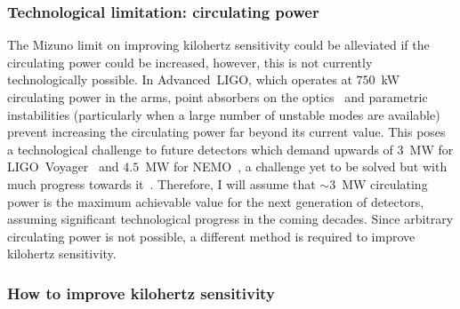 \subsubsection{Technological limitation: circulating power}
\label{sec:circulating_power}

The Mizuno limit on improving kilohertz sensitivity could be alleviated if the circulating power could be increased, however, this is not currently technologically possible. In Advanced~LIGO, which operates at $750$~kW circulating power in the arms, point absorbers on the optics~\cite{Brooks_2021} and parametric instabilities (particularly when a large number of unstable modes are available)~\cite{PhysRevLett.114.161102} prevent increasing the circulating power far beyond its current value. This poses a technological challenge to future detectors which demand upwards of $3$~MW for LIGO~Voyager~\cite{} and $4.5$~MW for NEMO~\cite{}, a challenge yet to be solved but with much progress towards it~\cite{}. %
Therefore, I will assume that $\sim3$~MW circulating power is the maximum achievable value for the next generation of detectors, assuming significant technological progress in the coming decades. Since arbitrary circulating power is not possible, a different method is required to improve kilohertz sensitivity.



\subsubsection{How to improve kilohertz sensitivity}

